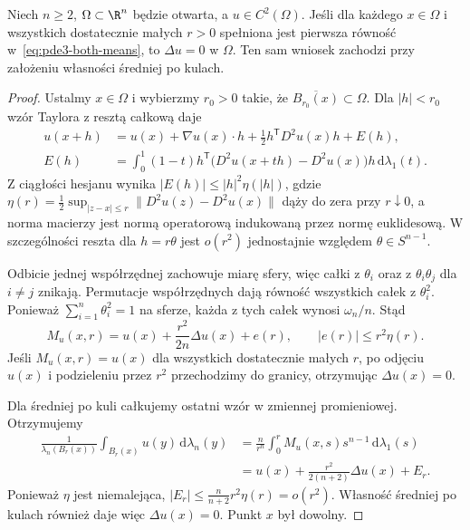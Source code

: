 \begin{stwierdzenie}
\label{prop:pde3-converse}
Niech $n\geq2$, $\Omega\subset\R^n$ będzie otwarta,
a $u\in C^2(\Omega)$. Jeśli dla każdego $x\in\Omega$
i wszystkich dostatecznie małych $r>0$ spełniona jest
pierwsza równość w~\eqref{eq:pde3-both-means}, to
$\Delta u=0$ w $\Omega$. Ten sam wniosek zachodzi przy
założeniu własności średniej po kulach.
\end{stwierdzenie}
\begin{proof}
Ustalmy $x\in\Omega$ i wybierzmy $r_0>0$ takie,
że $\overline{B_{r_0}(x)}\subset\Omega$.
Dla $|h|<r_0$ wzór Taylora z resztą całkową daje
\[
 \begin{aligned}
 u(x+h)&=u(x)+\nabla u(x)\cdot h
 +\tfrac12 h^{\mathsf T}D^2u(x)h+E(h),\\
 E(h)&=\int_0^1(1-t)h^{\mathsf T}
 \bigl(D^2u(x+th)-D^2u(x)\bigr)h\,\mathrm d\lambda_1(t).
 \end{aligned}
\]
Z ciągłości hesjanu wynika
$|E(h)|\leq |h|^2\eta(|h|)$, gdzie
$\eta(r)=\frac12\sup_{|z-x|\leq r}\|D^2u(z)-D^2u(x)\|$
dąży do zera przy $r\downarrow0$, a norma macierzy
jest normą operatorową indukowaną przez normę
euklidesową. W szczególności reszta dla $h=r\theta$
jest $o(r^2)$ jednostajnie względem $\theta\in S^{n-1}$.

Odbicie jednej współrzędnej zachowuje miarę sfery,
więc całki z $\theta_i$ oraz z $\theta_i\theta_j$
dla $i\ne j$ znikają. Permutacje współrzędnych dają
równość wszystkich całek z $\theta_i^2$.
Ponieważ $\sum_{i=1}^n\theta_i^2=1$ na sferze,
każda z tych całek wynosi $\omega_n/n$. Stąd
\[
 M_u(x,r)=u(x)+\frac{r^2}{2n}\Delta u(x)+e(r),
 \qquad |e(r)|\leq r^2\eta(r).
\]
Jeśli $M_u(x,r)=u(x)$ dla wszystkich dostatecznie małych
$r$, po odjęciu $u(x)$ i podzieleniu przez $r^2$
przechodzimy do granicy, otrzymując $\Delta u(x)=0$.

Dla średniej po kuli całkujemy ostatni wzór
w zmiennej promieniowej. Otrzymujemy
\[
 \begin{aligned}
 \frac{1}{\lambda_n(B_r(x))}
 \int_{B_r(x)}u(y)\,\mathrm d\lambda_n(y)
 &=\frac{n}{r^n}\int_0^r M_u(x,s)s^{n-1}\,
       \mathrm d\lambda_1(s)\\
 &=u(x)+\frac{r^2}{2(n+2)}\Delta u(x)+E_r .
 \end{aligned}
\]
Ponieważ $\eta$ jest niemalejąca,
$|E_r|\leq \frac{n}{n+2}r^2\eta(r)=o(r^2)$.
Własność średniej po kulach również daje więc
$\Delta u(x)=0$. Punkt $x$ był dowolny.
\end{proof}

